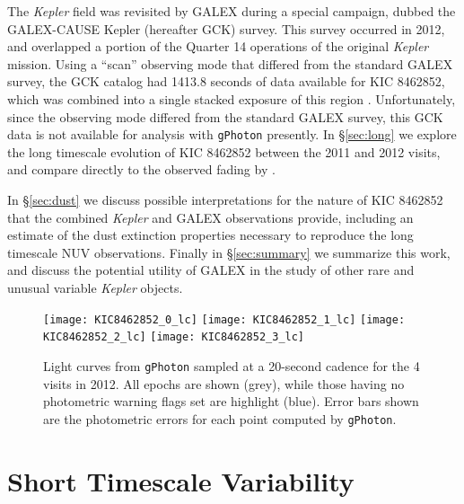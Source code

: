 \documentclass[twocolumn]{aastex6}
\newcommand{\Kepler}{\textsl{Kepler}\xspace}
\begin{document}
The \Kepler field was revisited by GALEX during a special campaign, dubbed the GALEX-CAUSE Kepler (hereafter GCK) survey. This survey occurred in 2012, and overlapped a portion of the Quarter 14 operations of the original \Kepler mission. Using a ``scan'' observing mode that differed from the standard GALEX survey, the GCK catalog had 1413.8 seconds of data available for KIC 8462852, which was combined into a single stacked exposure of this region \citep{olmedo2015}. Unfortunately, since the observing mode differed from the standard GALEX survey, this GCK data is not available for analysis with {\tt gPhoton} presently. In \S\ref{sec:long} we explore the long timescale evolution of KIC 8462852 between the 2011 and 2012 visits, and compare directly to the observed fading by \citet{montet2016}.

In \S\ref{sec:dust} we discuss possible interpretations for the nature of KIC 8462852 that the combined \Kepler and GALEX observations provide, including an estimate of the dust extinction properties necessary to reproduce the long timescale NUV observations. Finally in \S\ref{sec:summary} we summarize this work, and discuss the potential utility of GALEX in the study of other rare and unusual variable \Kepler objects.


\begin{figure}[!t]
\centering
\texttt{[image: KIC8462852\_0\_lc]}
\texttt{[image: KIC8462852\_1\_lc]}
\texttt{[image: KIC8462852\_2\_lc]}
\texttt{[image: KIC8462852\_3\_lc]}
\caption{
Light curves from {\tt gPhoton} sampled at a 20-second cadence for the 4 visits in 2012. All epochs are shown (grey), while those having no photometric warning flags set are highlight (blue). Error bars shown are the photometric errors for each point computed by {\tt gPhoton}.}
\label{fig:shorttime}
\end{figure}



\section{Short Timescale Variability}
\label{sec:short}
\end{document}
